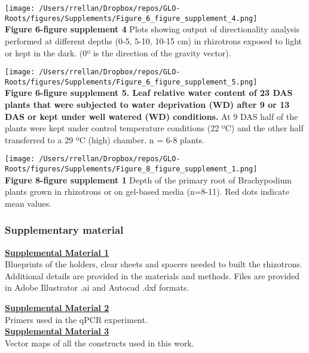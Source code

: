 \documentclass[]{article}
\begin{document}
\texttt{[image: /Users/rrellan/Dropbox/repos/GLO-Roots/figures/Supplements/Figure\_6\_figure\_supplement\_4.png]}\\\textbf{Figure
6-figure supplement 4} Plots showing output of directionality analysis
performed at different depths (0-5, 5-10, 10-15 cm) in rhizotrons
exposed to light or kept in the dark. (0º is the direction of the
gravity vector).\\\pagebreak

\texttt{[image: /Users/rrellan/Dropbox/repos/GLO-Roots/figures/Supplements/Figure\_6\_figure\_supplement\_5.png]}\\\textbf{Figure
6-figure supplement 5. Leaf relative water content of 23 DAS plants that
were subjected to water deprivation (WD) after 9 or 13 DAS or kept under
well watered (WD) conditions.} At 9 DAS half of the plants were kept
under control temperature conditions (22 ºC) and the other half
transferred to a 29 ºC (high) chamber. n = 6-8 plants.\\\pagebreak

\texttt{[image: /Users/rrellan/Dropbox/repos/GLO-Roots/figures/Supplements/Figure\_8\_figure\_supplement\_1.png]}\\\textbf{Figure
8-figure supplement 1} Depth of the primary root of Brachypodium plants
grown in rhizotrons or on gel-based media (n=8-11). Red dots indicate
mean values.\\\pagebreak

\subsubsection{Supplementary material}\label{supplementary-material-1}

\textbf{\href{https://www.dropbox.com/s/f01cg10hqehpnv6/supplement_1.zip?dl=0}{Supplemental
Material 1}}\\Blueprints of the holders, clear sheets and spacers needed
to built the rhizotrons. Additional details are provided in the
materials and methods. Files are provided in Adobe Illustrator .ai and
Autocad .dxf formats.

\textbf{\href{https://www.dropbox.com/s/hn1hhuttdby7y0j/supplement_2.csv?dl=0}{Supplemental
Material 2}}\\Primers used in the qPCR
experiment.\\\textbf{\href{https://www.dropbox.com/s/kg0r5df4nx3tjpy/supplement_3.zip?dl=0}{Supplemental
Material 3}}\\Vector maps of all the constructs used in this work.
\end{document}
